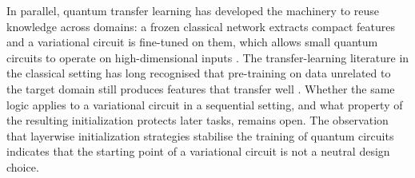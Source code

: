 \documentclass[preprint,number,sort&compress]{elsarticle}
\begin{document}
In parallel, quantum transfer learning has developed the machinery to reuse
knowledge across domains: a frozen classical network extracts compact
features and a variational circuit is fine-tuned on them, which allows small
quantum circuits to operate on high-dimensional inputs \cite{mari2020transfer,
martinperez2026cmes, martinperez2026soco}. The transfer-learning literature
in the classical setting has long recognised that pre-training on data
unrelated to the target domain still produces features that transfer well
\cite{Yosinski14, pan2009survey}. Whether the same logic applies
to a variational circuit in a sequential setting, and what property of the
resulting initialization protects later tasks, remains open. The observation
that layerwise initialization strategies stabilise the training of quantum
circuits \cite{Skolik21} indicates that the starting point of a
variational circuit is not a neutral design choice.
\end{document}
